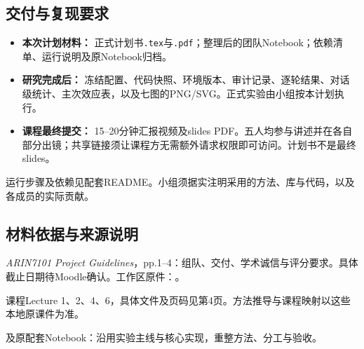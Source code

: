 \documentclass[11pt,a4paper]{article}
\newcommand{\code}[1]{\texttt{\small #1}}
\begin{document}
\subsection{交付与复现要求}
\begin{itemize}
\item \textbf{本次计划材料：} 正式计划书\code{.tex}与\code{.pdf}；整理后的团队Notebook；依赖清单、运行说明及原Notebook归档。
\item \textbf{研究完成后：} 冻结配置、代码快照、环境版本、审计记录、逐轮结果、对话级统计、主次效应表，以及七图的PNG/SVG。正式实验由小组按本计划执行。
\item \textbf{课程最终提交：} 15--20分钟汇报视频及slides PDF。五人均参与讲述并在各自部分出镜；共享链接须让课程方无需额外请求权限即可访问。计划书不是最终slides。
\end{itemize}
运行步骤及依赖见配套README。小组须据实注明采用的方法、库与代码，以及各成员的实际贡献。

\subsection{材料依据与来源说明}
{\small\begin{enumerate}[label={[\arabic*]},itemsep=2pt]
\item \textit{ARIN7101 Project Guidelines}，pp.1--4：组队、交付、学术诚信与评分要求。具体截止日期待Moodle确认。工作区原件：\newline{}。
\item 课程Lecture 1、2、4、6，具体文件及页码见第4页。方法推导与课程映射以这些本地原课件为准。
\item {}及原配套Notebook：沿用实验主线与核心实现，重整方法、分工与验收。
\end{enumerate}}
\end{document}
